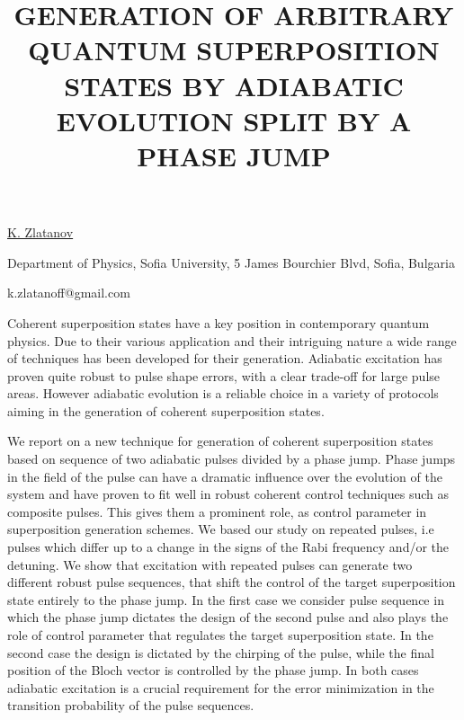 \title{GENERATION OF ARBITRARY QUANTUM SUPERPOSITION STATES BY ADIABATIC EVOLUTION SPLIT BY A PHASE JUMP}

\underline{K. Zlatanov}  

{\normalsize{\vspace{-4mm}
Department of Physics, Sofia University, 5 James Bourchier Blvd, Sofia, Bulgaria



\email k.zlatanoff@gmail.com}}

Coherent superposition states have a key position in contemporary quantum physics. Due to their various 
application and their intriguing nature a wide range of techniques has been developed for their generation.
Adiabatic excitation has proven quite robust to pulse shape errors, with a clear trade-off for large pulse areas. However adiabatic evolution is a reliable choice in a 
variety of protocols aiming in the generation of coherent superposition states. 

We report on a new technique for generation of coherent superposition states based on sequence of two
adiabatic pulses divided by a phase jump. Phase jumps in the field of the pulse can have a dramatic
influence over the evolution of the system and have proven to fit well in robust coherent control techniques such
as composite pulses. This gives them a prominent role,
as control parameter in superposition generation schemes. We based our study on repeated pulses, i.e pulses which differ up to a change in the signs of the Rabi frequency and/or the detuning. We show that excitation with repeated
pulses can generate two different robust pulse sequences, that shift the control of the target superposition state
entirely to the phase jump. In the first case we consider pulse sequence in which the phase jump dictates the
design of the second pulse and also plays the role of control parameter that regulates the target superposition
state. In the second case the design is dictated by the chirping of the pulse, while the final position of the Bloch
vector is controlled by the phase jump. In both cases adiabatic excitation is a crucial requirement for the error
minimization in the transition probability of the pulse sequences.

\vspace{\baselineskip}